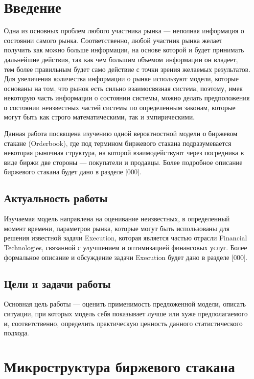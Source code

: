 \documentclass[12pt, a4paper]{article}
\begin{document}
\section{Введение}

Одна из основных проблем любого участника рынка --- неполная информация о состоянии самого рынка. Соответственно, любой участник рынка желает получить как можно больше информации, на основе которой и будет принимать дальнейшие действия, так как чем большим объемом информации он владеет, тем более правильным будет само действие с точки зрения желаемых результатов. Для увеличения количества информации о рынке используют модели, которые основаны на том, что рынок есть сильно взаимосвязная система, поэтому, имея некоторую часть информации о состоянии системы, можно делать предположения о состоянии неизвестных частей системы по определенным законам, которые могут быть как строго математическими, так и эмпирическими.

Данная работа посвящена изучению одной вероятностной модели о биржевом стакане (Orderbook), где под термином биржевого стакана подразумевается некоторая рыночная структура, на которой взаимодействуют через посредника в виде биржи две стороны --- покупатели и продавцы. Более подробное описание биржевого стакана будет дано в разделе [000].

\subsection{Актуальность работы}
Изучаемая модель направлена на оценивание неизвестных, в определенный момент времени, параметров рынка, которые могут быть использованы для решения известной задачи Execution, которая является частью отрасли Financial Technologies, связанной с улучшением и оптимизацией финансовых услуг. Более формальное описание и обсуждение задачи Execution будет дано в разделе [000].

\subsection{Цели и задачи работы}
Основная цель работы --- оценить применимость предложенной модели, описать ситуации, при которых модель себя показывает лучше или хуже предполагаемого и, соответственно, определить практическую ценность данного статистического подхода.

\newpage

\section{Микроструктура биржевого стакана}
\end{document}
